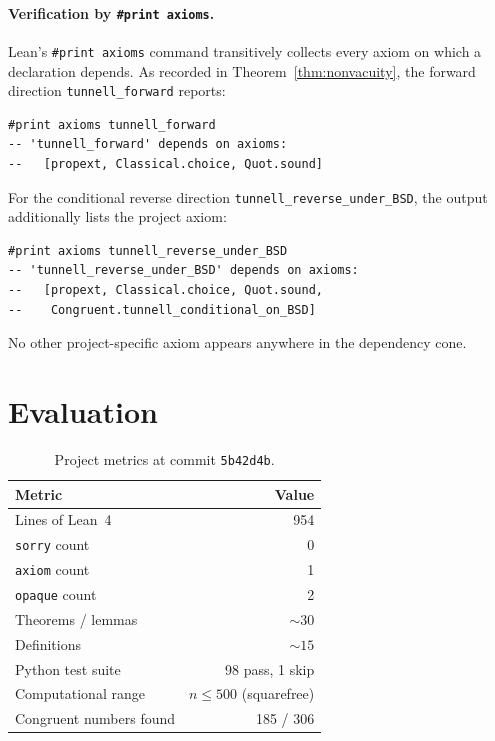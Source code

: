 \documentclass[11pt,a4paper]{article}
\theoremstyle{definition}
\newcommand{\lean}[1]{\texttt{#1}}
\begin{document}
\paragraph{Verification by \texttt{\#print axioms}.}
Lean's \texttt{\#print axioms} command transitively collects every
axiom on which a declaration depends.  As recorded in
Theorem~\ref{thm:nonvacuity}, the forward direction
\texttt{tunnell\_forward} reports:
\begin{lstlisting}[numbers=none,frame=single,xleftmargin=2em,basicstyle=\ttfamily\footnotesize]
#print axioms tunnell_forward
-- 'tunnell_forward' depends on axioms:
--   [propext, Classical.choice, Quot.sound]
\end{lstlisting}
For the conditional reverse direction
\texttt{tunnell\_reverse\_under\_BSD}, the output additionally lists
the project axiom:
\begin{lstlisting}[numbers=none,frame=single,xleftmargin=2em,basicstyle=\ttfamily\footnotesize]
#print axioms tunnell_reverse_under_BSD
-- 'tunnell_reverse_under_BSD' depends on axioms:
--   [propext, Classical.choice, Quot.sound,
--    Congruent.tunnell_conditional_on_BSD]
\end{lstlisting}
No other project-specific axiom appears anywhere in the
dependency cone.

\section{Evaluation}\label{sec:eval}

\begin{table}[ht]
\centering
\begin{tabular}{@{}lr@{}}
\toprule
\textbf{Metric} & \textbf{Value} \\
\midrule
Lines of Lean~4            & 954 \\
\lean{sorry} count         & 0 \\
\lean{axiom} count         & 1 \\
\lean{opaque} count        & 2 \\
Theorems / lemmas          & ${\sim}30$ \\
Definitions                & ${\sim}15$ \\
Python test suite          & 98 pass, 1 skip \\
Computational range        & $n \le 500$ (squarefree) \\
Congruent numbers found    & 185 / 306 \\
\bottomrule
\end{tabular}
\caption{Project metrics at commit \texttt{5b42d4b}.}
\label{tab:metrics}
\end{table}
\end{document}
